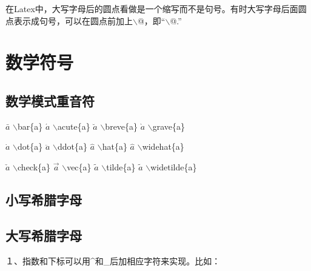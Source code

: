 \documentclass[UTF8]{ctexart}
\begin{document}
在Latex中，大写字母后的圆点看做是一个缩写而不是句号。有时大写字母后面圆点表示成句号，可以在圆点前加上$\backslash$@，即“$\backslash$@.”



\section{数学符号}

\subsection{数学模式重音符}

$\bar{a}$ \quad $\backslash$bar\{a\} \qquad
$\acute{a}$ \quad $\backslash$acute\{a\} \qquad
$\breve{a}$ \quad $\backslash$breve\{a\} \qquad
$\grave{a}$ \quad $\backslash$grave\{a\} \qquad

$\dot{a}$ \quad $\backslash$dot\{a\} \qquad
$\ddot{a}$ \quad $\backslash$ddot\{a\} \qquad
$\hat{a}$ \quad $\backslash$hat\{a\} \qquad
$\widehat{a}$ \quad $\backslash$widehat\{a\} \qquad

$\check{a}$ \quad $\backslash$check\{a\} \qquad
$\vec{a}$ \quad $\backslash$vec\{a\} \qquad
$\tilde{a}$ \quad $\backslash$tilde\{a\} \qquad
$\widetilde{a}$ \quad $\backslash$widetilde\{a\} \qquad

\subsection{小写希腊字母}

\subsection{大写希腊字母}

１、指数和下标可以用\^{}和\_后加相应字符来实现。比如：
\end{document}
